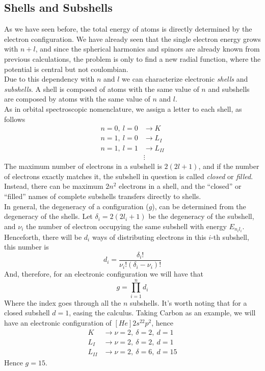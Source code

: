 \documentclass[../qm.tex]{subfiles}
\begin{document}
	\subsection{Shells and Subshells}
	As we have seen before, the total energy of atoms is directly determined by the electron configuration. We have already seen that the single electron energy grows with $n+l$, and since the spherical harmonics and spinors are already known from previous calculations, the problem is only to find a new radial function, where the potential is central but not coulombian.\\
	Due to this dependency with $n$ and $l$ we can characterize electronic \textit{shells} and \textit{subshells}. A shell is composed of atoms with the same value of $n$ and subshells are composed by atoms with the same value of $n$ and $l$.\\
	As in orbital spectroscopic nomenclature, we assign a letter to each shell, as follows
	\begin{equation}
		\begin{aligned}
			n=0,\ l=0&\longrightarrow K\\
			n=1,\ l=0&\longrightarrow L_I\\
			n=1,\ l=1&\longrightarrow L_{II}\\
			&\vdots
		\end{aligned}
		\label{eq:shellsandsubshells}
	\end{equation}
	The maximum number of electrons in a subshell is $2(2l+1)$, and if the number of electrons exactly matches it, the subshell in question is called \textit{closed} or \textit{filled}.\\
	Instead, there can be maximum $2n^2$ electrons in a shell, and the ``closed'' or ``filled'' names of complete subshells transfers directly to shells.\\
	In general, the degeneracy of a configuration ($g$), can be determined from the degeneracy of the shells. Let $\delta_i=2(2l_i+1)$ be the degeneracy of the subshell, and $\nu_i$ the number of electron occupying the same subshell with energy $E_{n_il_i}$. Henceforth, there will be $d_i$ ways of distributing electrons in this $i$-th subshell, this number is
	\begin{equation}
		d_i=\frac{\delta_i!}{\nu_i!\left( \delta_i-\nu_i \right)!}
		\label{eq:subshelldegeneracy}
	\end{equation}
	And, therefore, for an electronic configuration we will have that
	\begin{equation*}
		g=\prod_{i=1}^nd_i
	\end{equation*}
	Where the index goes through all the $n$ subshells. It's worth noting that for a closed subshell $d=1$, easing the calculus. Taking Carbon as an example, we will have an electronic configuration of $[He]2s^22p^2$, hence
	\begin{equation}
		\begin{aligned}
			K&\rightarrow\nu=2,\ \delta=2,\ d=1\\
			L_I&\rightarrow\nu=2,\ \delta=2,\ d=1\\
			L_{II}&\rightarrow\nu=2,\ \delta=6,\ d=15
		\end{aligned}
		\label{eq:carbondegeneracy}
	\end{equation}
	Hence $g=15$.
\end{document}
